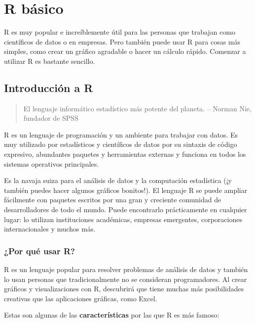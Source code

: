 \documentclass[
]{book}
\begin{document}
\hypertarget{intro}{%
\chapter{R básico}\label{intro}}

R es muy popular e increíblemente útil para las personas que trabajan como científicos de datos o en empresas. Pero también puede usar R para cosas más simples, como crear un gráfico agradable o hacer un cálculo rápido. Comenzar a utilizar R es bastante sencillo.

\hypertarget{introducciuxf3n-a-r}{%
\section{Introducción a R}\label{introducciuxf3n-a-r}}

\begin{quote}
El lenguaje informático estadístico más potente del planeta.
-- Norman Nie, fundador de SPSS
\end{quote}

R es un lenguaje de programación y un ambiente para trabajar con datos. Es muy utilizado por estadísticos y científicos de datos por su sintaxis de código expresivo, abundantes paquetes y herramientas externas y funciona en todos los sistemas operativos principales.

Es la navaja suiza para el análisis de datos y la computación estadística (¡y también puedes hacer algunos gráficos bonitos!). El lenguaje R se puede ampliar fácilmente con paquetes escritos por una gran y creciente comunidad de desarrolladores de todo el mundo. Puede encontrarlo prácticamente en cualquier lugar: lo utilizan instituciones académicas, empresas emergentes, corporaciones internacionales y muchos más.

\hypertarget{por-quuxe9-usar-r}{%
\subsection{¿Por qué usar R?}\label{por-quuxe9-usar-r}}

R es un lenguaje popular para resolver problemas de análisis de datos y también lo usan personas que tradicionalmente no se consideran programadores. Al crear gráficos y visualizaciones con R, descubrirá que tiene muchas más posibilidades creativas que las aplicaciones gráficas, como Excel.

Estas son algunas de las \textbf{características} por las que R es más famoso:
\end{document}
